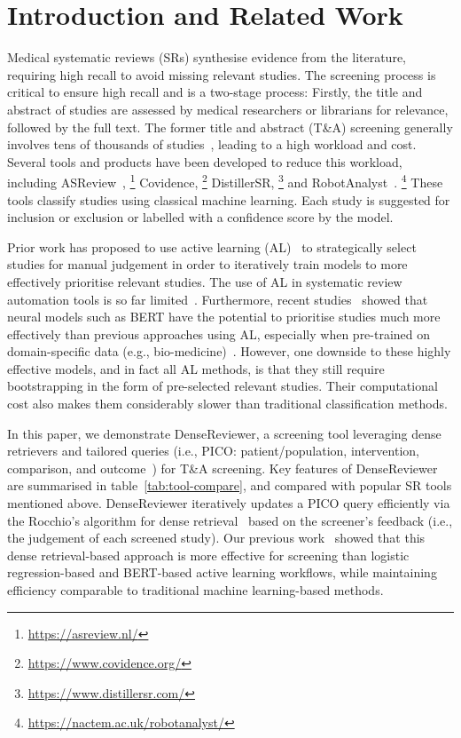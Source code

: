 \section{Introduction and Related Work}
Medical systematic reviews (SRs) synthesise evidence from the literature, requiring high recall to avoid missing relevant studies. The screening process is critical to ensure high recall and is a two-stage process: Firstly, the title and abstract of studies are assessed by medical researchers or librarians for relevance, followed by the full text. The former title and abstract (T\&A) screening generally involves tens of thousands of studies~\cite{borah2017analysis}, leading to a high workload and cost. Several tools and products have been developed to reduce this workload, including
ASReview~\cite{van2021open},%
\footnote{\url{https://asreview.nl/}} 
Covidence,%
\footnote{\url{https://www.covidence.org/}}
DistillerSR,%
\footnote{\url{https://www.distillersr.com/}}
and RobotAnalyst~\cite{przybyla2018prioritising}.%
\footnote{\url{https://nactem.ac.uk/robotanalyst/}}
These tools classify studies using classical machine learning. Each study is suggested for inclusion or exclusion or labelled with a confidence score by the model. 

Prior work has proposed to use active learning (AL)~\cite{settles2009active} to strategically select studies for manual judgement in order to iteratively train models to more effectively prioritise relevant studies. The use of AL in systematic review automation tools is so far limited~\cite{van2021open}. Furthermore, recent studies~\cite{yang2022goldilocks,mao2024reproducibility} showed that neural models such as BERT have the potential to prioritise studies much more effectively than previous approaches using AL, especially when pre-trained on domain-specific data (e.g., bio-medicine)~\cite{mao2024reproducibility}. However, one downside to these highly effective models, and in fact all AL methods, is that they still require bootstrapping in the form of pre-selected relevant studies. Their computational cost also makes them considerably slower than traditional classification methods. 

In this paper, we demonstrate DenseReviewer, a screening tool leveraging dense retrievers and tailored queries (i.e., PICO: patient/population, intervention, comparison, and outcome~\cite{scells2017integrating}) for T\&A screening. Key features of DenseReviewer are summarised in table~\ref{tab:tool-compare}, and compared with popular SR tools mentioned above.
DenseReviewer iteratively updates a PICO query efficiently via the Rocchio's algorithm for dense retrieval~\cite{li2023pseudo} based on the screener's feedback (i.e., the judgement of each screened study). 
Our previous work~\cite{mao2024dense} showed that this dense retrieval-based approach is more effective for screening than logistic regression-based and BERT-based active learning workflows, while maintaining efficiency comparable to traditional machine learning-based methods. 

